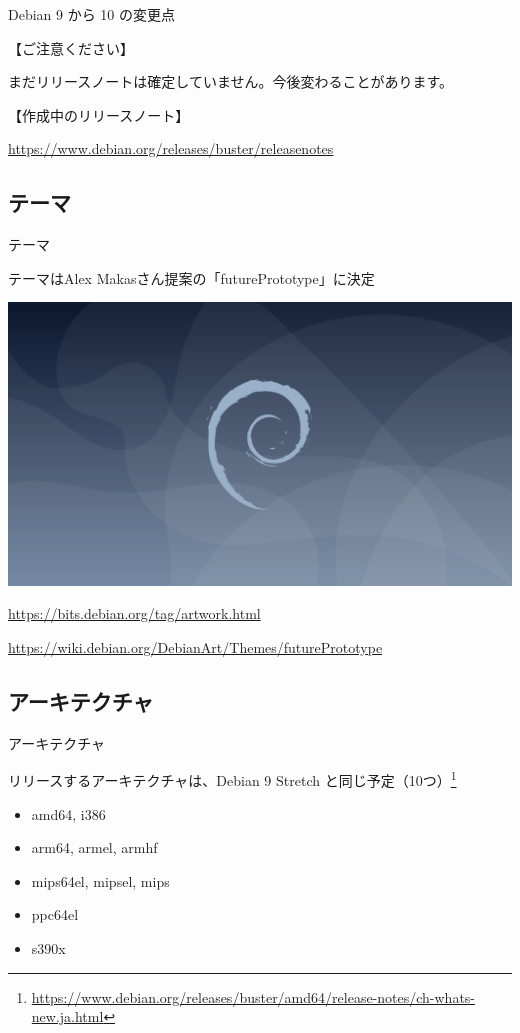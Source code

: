 \begin{frame}{Debian 9 から 10 の変更点}%

【ご注意ください】

まだリリースノートは確定していません。今後変わることがあります。

【作成中のリリースノート】

\url{https://www.debian.org/releases/buster/releasenotes}

\end{frame}


\subsection{テーマ}

\begin{frame}{テーマ}%

テーマはAlex Makasさん提案の「futurePrototype」に決定
  
\begin{center}
  \includegraphics[width=0.75\hsize]{image201906/futurePrototype-wallpaper-1920x1080.png}
\end{center}

\url{https://bits.debian.org/tag/artwork.html}

\url{https://wiki.debian.org/DebianArt/Themes/futurePrototype}

\end{frame}


\subsection{アーキテクチャ}

\begin{frame}{アーキテクチャ}%

リリースするアーキテクチャは、Debian 9 Stretch と同じ予定（10つ）\footnote{\url{https://www.debian.org/releases/buster/amd64/release-notes/ch-whats-new.ja.html}}

\begin{itemize}
\item amd64, i386
\item arm64, armel, armhf
\item mips64el, mipsel, mips
\item ppc64el
\item s390x
\end{itemize}

\end{frame}


